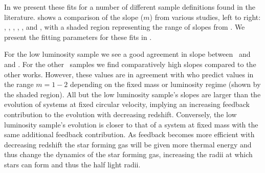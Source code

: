 In  we present these fits for a number of different sample definitions found in the literature.  shows a comparison of the slope ($m$) from various studies, left to right: \flares, \cite{Marshall21}, \cite{Oesch_2010}, \cite{Holwerda_2015}, \cite{Kawamata_2018}, and \cite{Ono_2013}, with a shaded region representing the range of slopes from \cite{Ma_18_size}. We present the fitting parameters for these fits in .

For the low luminosity sample we see a good agreement in slope between \flares\ and \cite{Oesch_2010} and \cite{Ono_2013}. For the other \flares\ samples we find comparatively high slopes compared to the other works. However, these values are in agreement with \cite{Ma_18_size} who predict values in the range $m=1-2$ depending on the fixed mass or luminosity regime (shown by the shaded region). All but the low luminosity sample's slopes are larger than the evolution of systems at fixed circular velocity, implying an increasing feedback contribution to the evolution with decreasing redshift. Conversely, the low luminosity sample's evolution is closer to that of a system at fixed mass with the same additional feedback contribution. As feedback becomes more efficient with decreasing redshift the star forming gas will be given more thermal energy and thus change the dynamics of the star forming gas, increasing the radii at which stars can form and thus the half light radii.


